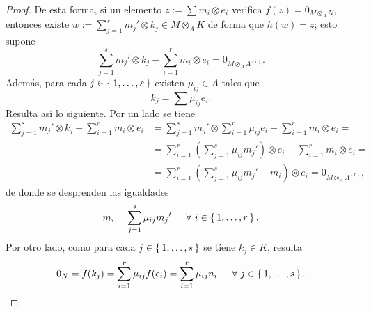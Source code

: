 \documentclass[../main.tex]{subfiles}
\begin{document}
\begin{proof}
	De esta forma, si un elemento $z:=\sum m_i\otimes e_i$ verifica $f(z)=0_{M\otimes_A N}$, entonces existe $w:=\sum_{j=1}^s{m_j}'\otimes k_j\in M\otimes_A K$ de forma que $h(w)=z$; esto supone
	$$\sum_{j=1}^s {m_j}'\otimes k_j-\sum_{i=1}^r m_i\otimes e_i=0_{M\otimes_A A^{(r)}}.$$
	Además, para cada $j\in\set{1,\dots,s}$ existen $\mu_{ij}\in A$ tales que $$k_j=\sum \mu_{ij}e_i.$$
	Resulta así lo siguiente. Por un lado se tiene
	\begin{align*}
	\sum_{j=1}^s {m_j}'\otimes k_j-\sum_{i=1}^r m_i\otimes e_i&=\sum_{j=1}^s {m_j}'\otimes \sum_{i=1}^r \mu_{ij}e_i-\sum_{i=1}^r m_i\otimes e_i=\\
	&=\sum_{i=1}^r(\sum_{j=1}^s\mu_{ij}{m_j}')\otimes e_i-\sum_{i=1}^r m_i\otimes e_i=\\
	&=\sum_{i=1}^r(\sum_{j=1}^s\mu_{ij}{m_j}'-m_i)\otimes e_i=0_{M\otimes_A A^{(r)}},
	\end{align*}
	de donde se desprenden las igualdades
	\begin{equation}
	m_i=\sum_{j=1}^s\mu_{ij}{m_j}'\hspace{15pt}\forall\ i\in\set{1,\dots,r}.
	\end{equation}
	Por otro lado, como para cada $j\in\set{1,\dots,s}$ se tiene $k_j\in K$, resulta
	\begin{equation}
	0_N=f(k_j)=\sum_{i=1}^r\mu_{ij}f(e_i)=\sum_{i=1}^r\mu_{ij}n_i\hspace{15pt}\forall\ j\in\set{1,\dots,s}.
	\end{equation}
\end{proof}
\end{document}
